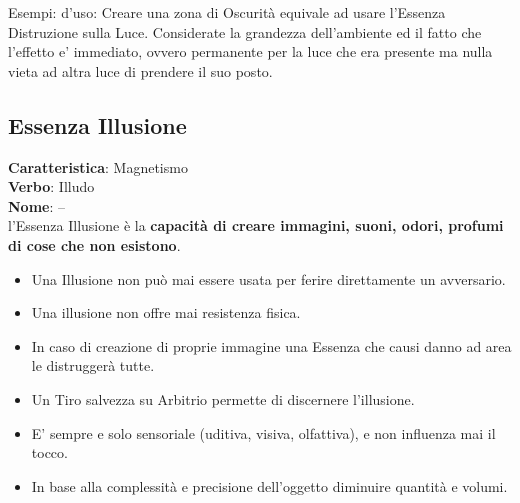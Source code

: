 \documentclass[a4paper,11pt,twoside,openany]{book}
\begin{document}
\bigskip

Esempi: d'uso:
Creare una zona di Oscurità equivale ad usare l'Essenza Distruzione sulla Luce. Considerate la grandezza dell'ambiente ed il fatto che l'effetto e' immediato, ovvero permanente per la luce che era presente ma nulla vieta ad altra luce di prendere il suo posto.
\pagebreak

\subsection{Essenza Illusione}

\label{essenza-illusione---magnetismo}

\textbf{Caratteristica}: Magnetismo\\
\textbf{Verbo}: Illudo\\
\textbf{Nome}: --\\

l'Essenza Illusione è la \textbf{capacità di creare immagini, suoni,
	odori, profumi di cose che non esistono}.
\begin{itemize}
	\item
	      Una Illusione non può mai essere usata per ferire direttamente un avversario.
	\item
	      Una illusione non offre mai resistenza fisica.
	\item
	      In caso di creazione di proprie immagine una Essenza che causi danno ad area le distruggerà tutte.
	\item
	      Un Tiro salvezza su Arbitrio permette di discernere l'illusione.
	\item
	      E' sempre e solo sensoriale (uditiva, visiva, olfattiva), e non influenza mai il tocco.
	\item
	      In base alla complessità e precisione dell'oggetto diminuire quantità e volumi.
\end{itemize}

\bigskip
\end{document}
